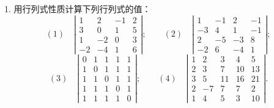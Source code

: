 \documentclass[UTF8, 12pt, fontset=fandol, oneside]{ctexart}
\begin{document}
1. 用行列式性质计算下列行列式的值：
\[
(1)\quad
\left|\begin{array}{rrrr}
1 & 2 & -1 & 2\\
3 & 0 & 1 & 5\\
1 & -2 & 0 & 3\\
-2 & -4 & 1 & 6
\end{array}\right|;
\qquad
(2)\quad
\left|\begin{array}{rrrr}
1 & -1 & 2 & -1\\
-3 & 4 & 1 & -1\\
2 & -5 & -3 & 8\\
-2 & 6 & -4 & 1
\end{array}\right|;
\]
\[
(3)\quad
\left|\begin{array}{rrrrr}
0 & 1 & 1 & 1 & 1\\
1 & 0 & 1 & 1 & 1\\
1 & 1 & 0 & 1 & 1\\
1 & 1 & 1 & 0 & 1\\
1 & 1 & 1 & 1 & 0
\end{array}\right|;
\qquad
(4)\quad
\left|\begin{array}{rrrrr}
1 & 2 & 3 & 4 & 5\\
2 & 3 & 7 & 10 & 13\\
3 & 5 & 11 & 16 & 21\\
2 & -7 & 7 & 7 & 2\\
1 & 4 & 5 & 3 & 10
\end{array}\right|.
\]
\end{document}

